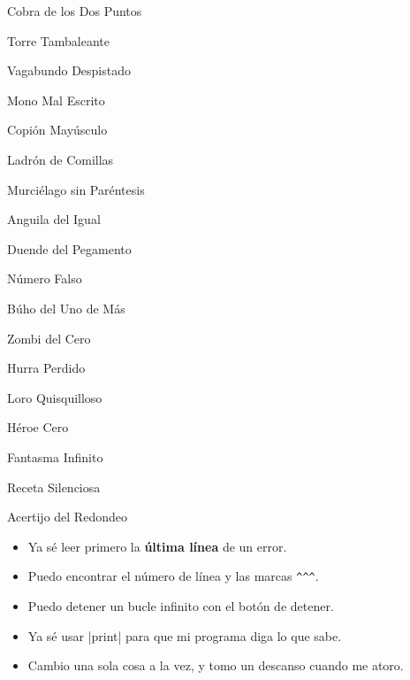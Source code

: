 \begin{tcbraster}[raster columns=3, raster column skip=8pt, raster equal height]
\begin{tcolorbox}[colback=errbg, colframe=errframe, boxrule=0.5pt, arc=4pt, fontupper=\small]
\tick Cobra de los Dos Puntos\par \tick Torre Tambaleante\par \tick Vagabundo Despistado\par \tick Mono Mal Escrito\par \tick Copión Mayúsculo\par \tick Ladrón de Comillas
\end{tcolorbox}
\begin{tcolorbox}[colback=errbg, colframe=errframe, boxrule=0.5pt, arc=4pt, fontupper=\small]
\tick Murciélago sin Paréntesis\par \tick Anguila del Igual\par \tick Duende del Pegamento\par \tick Número Falso\par \tick Búho del Uno de Más\par \tick Zombi del Cero
\end{tcolorbox}
\begin{tcolorbox}[colback=errbg, colframe=errframe, boxrule=0.5pt, arc=4pt, fontupper=\small]
\tick Hurra Perdido\par \tick Loro Quisquilloso\par \tick Héroe Cero\par \tick Fantasma Infinito\par \tick Receta Silenciosa\par \tick Acertijo del Redondeo
\end{tcolorbox}
\end{tcbraster}

\begin{itemize}[label={}, leftmargin=0pt]
  \item \tick Ya sé leer primero la \textbf{última línea} de un error.
  \item \tick Puedo encontrar el número de línea y las marcas \texttt{\textasciicircum\textasciicircum\textasciicircum}.
  \item \tick Puedo detener un bucle infinito con el botón de detener.
  \item \tick Ya sé usar \py|print| para que mi programa diga lo que sabe.
  \item \tick Cambio una sola cosa a la vez, y tomo un descanso cuando me atoro.
\end{itemize}
